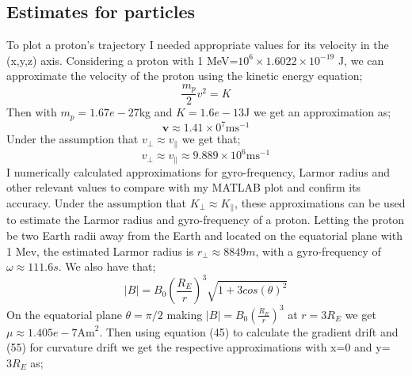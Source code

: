 \documentclass[14paper,11pt,hidelinks]{article}
\begin{document}
\subsection{Estimates for particles}
To plot a proton's trajectory I needed appropriate values for its velocity in the (x,y,z) axis. Considering a proton with 1 MeV=\begin{math} 10^6\times1.6022\times10^{-19}\end{math} J, we can approximate the velocity of the proton using the kinetic energy equation;
\begin{equation}
\frac{m_p}{2}v^2=K
\end{equation}
Then with \begin{math} m_p=1.67e-27\end{math}kg and \begin{math} K=1.6e-13\end{math}J we get an approximation as;
\begin{equation}
\mathbf{v}\approx1.41\times0^7 \mbox{ms}^{-1}
\end{equation}
Under the assumption that \begin{math} v_\bot \approx v_\parallel \end{math} we get that;
\begin{equation}
v_\bot\approx v_\parallel \approx9.889\times10^6\mbox{ms}^{-1}
\end{equation}
I numerically calculated approximations for gyro-frequency, Larmor radius and other relevant values to compare with my MATLAB plot and confirm its accuracy. Under the assumption that \begin{math} K_\bot \approx K_\parallel \end{math}, these approximations can be used to estimate the Larmor radius and gyro-frequency of a proton. Letting the proton be two Earth radii away from the Earth and located on the equatorial plane with 1 Mev, the estimated Larmor radius is \begin{math} r_\bot\approx 8849 m \end{math}, with a gyro-frequency of \begin{math} \omega\approx111.6 s\end{math}. We also have that;
\begin{equation}
|B|=B_0\left(\frac{R_E}{r}\right)^3\sqrt{1+3cos(\theta)^2}
\end{equation}
On the equatorial plane \begin{math} \theta=\pi/2\end{math} making \begin{math}|B|=B_0\left(\frac{R_E}{r}\right)^3 \end{math} at \begin{math}r=3R_E\end{math} we get \begin{math} \mu\approx1.405e-7 \mbox{Am}^2\end{math}. Then using equation (45) to calculate the gradient drift and (55) for curvature drift we get the respective approximations with x=0 and y=\begin{math}3R_E\end{math} as;
\end{document}
